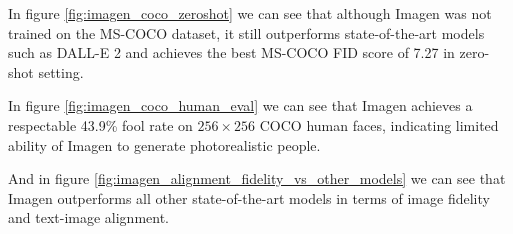 In figure \ref{fig:imagen_coco_zeroshot} we can see that although Imagen was not trained on the MS-COCO dataset, it still outperforms state-of-the-art models such as DALL-E 2 \cite{dalle_2} and achieves the best MS-COCO FID score of 7.27 in zero-shot setting.

In figure \ref{fig:imagen_coco_human_eval} we can see that Imagen achieves a respectable 43.9\% fool rate on $256\times 256$ COCO human faces, indicating limited ability of Imagen to generate photorealistic people.

And in figure \ref{fig:imagen_alignment_fidelity_vs_other_models} we can see that Imagen outperforms all other state-of-the-art models in terms of image fidelity and text-image alignment.
